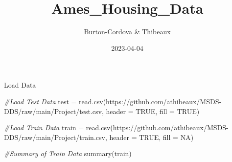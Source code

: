 \documentclass[
]{article}
\title{Ames\_Housing\_Data}
\author{Burton-Cordova \& Thibeaux}
\date{2023-04-04}
\newenvironment{Shaded}{\begin{snugshade}}{\end{snugshade}}
\newcommand{\AttributeTok}[1]{\textcolor[rgb]{0.77,0.63,0.00}{#1}}
\newcommand{\CommentTok}[1]{\textcolor[rgb]{0.56,0.35,0.01}{\textit{#1}}}
\newcommand{\ConstantTok}[1]{\textcolor[rgb]{0.00,0.00,0.00}{#1}}
\newcommand{\FunctionTok}[1]{\textcolor[rgb]{0.00,0.00,0.00}{#1}}
\newcommand{\NormalTok}[1]{#1}
\newcommand{\OtherTok}[1]{\textcolor[rgb]{0.56,0.35,0.01}{#1}}
\newcommand{\StringTok}[1]{\textcolor[rgb]{0.31,0.60,0.02}{#1}}
\begin{document}
\maketitle

Load Data

\begin{Shaded}
\begin{Highlighting}[]
\CommentTok{\#Load Test Data}
\NormalTok{test }\OtherTok{=} \FunctionTok{read.csv}\NormalTok{(}\StringTok{\textquotesingle{}https://github.com/athibeaux/MSDS{-}DDS/raw/main/Project/test.csv\textquotesingle{}}\NormalTok{, }\AttributeTok{header =} \ConstantTok{TRUE}\NormalTok{, }\AttributeTok{fill =} \ConstantTok{TRUE}\NormalTok{)}

\CommentTok{\#Load Train Data}
\NormalTok{train }\OtherTok{=} \FunctionTok{read.csv}\NormalTok{(}\StringTok{\textquotesingle{}https://github.com/athibeaux/MSDS{-}DDS/raw/main/Project/train.csv\textquotesingle{}}\NormalTok{, }\AttributeTok{header =} \ConstantTok{TRUE}\NormalTok{, }\AttributeTok{fill =} \ConstantTok{NA}\NormalTok{)}

\CommentTok{\#Summary of Train Data}
\FunctionTok{summary}\NormalTok{(train)}
\end{Highlighting}
\end{Shaded}
\end{document}
